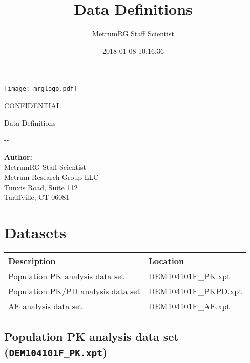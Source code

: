 \documentclass[]{article}
\title{Data Definitions}
\author{MetrumRG Staff Scientist}
\date{2018-01-08 10:16:36}
\newcommand{\todaymetrum}{\the\year-\twodigit{\month}-\twodigit{\day}}
\newcommand{\doctitle}{Data Definitions}
\newcommand{\scientist}{MetrumRG Staff Scientist}
\begin{document}
\begin{center}
\texttt{[image: mrglogo.pdf]}
\vspace{1cm}

{\Large CONFIDENTIAL}
\vspace{3.0cm}

{\huge \doctitle}
\vspace{1cm}

\todaymetrum
\vspace{6cm}

{\large\bfseries Author:}\\
\scientist \\
 Metrum Research Group LLC\\
Tunxis Road, Suite 112\\
Tariffville, CT 06081\\
\end{center}


\newpage



\section{Datasets}\label{datasets}

\begin{tabular}{|p{2.85in}|p{2.55in}|}
\hline
Description & Location\\
\hline
Population PK analysis data set & \hyperref[DEM104101F_PK]{DEM104101F\_PK.xpt}\\
\hline
Population PK/PD analysis data set & \hyperref[DEM104101F_PKPD]{DEM104101F\_PKPD.xpt}\\
\hline
AE analysis data set & \hyperref[DEM104101F_AE]{DEM104101F\_AE.xpt}\\
\hline
\end{tabular}

\subsection{\texorpdfstring{Population PK analysis data set
(\texttt{DEM104101F\_PK.xpt})
\label{DEM104101F_PK}}{Population PK analysis data set (DEM104101F\_PK.xpt) }}\label{population-pk-analysis-data-set-dem104101f_pk.xpt}

\noindent
\end{document}
